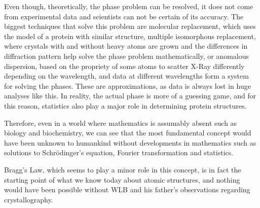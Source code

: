 \documentclass[14pt]{article}
\begin{document}
Even though, theoretically, the phase problem can be resolved, it does not come from experimental data and scientists can not be certain of its accuracy. The biggest techniques that solve this problem are molecular replacement, which uses the model of a protein with similar structure, multiple isomorphous replacement, where crystals with and without heavy atoms are grown and the differences in diffraction pattern help solve the phase problem mathematically, or anomalous dispersion, based on the propriety of some atoms to scatter X-Ray differently depending on the wavelength, and data at different wavelengths form a system for solving the phases. These are approximations, as data is always lost in huge analyses like this. In reality, the actual phase is more of a guessing game, and for this reason, statistics also play a major role in determining protein structures.

Therefore, even in a world where mathematics is assumably absent such as biology and biochemistry, we can see that the most fundamental concept would have been unknown to humankind without developments in mathematics such as solutions to Schrödinger's equation, Fourier transformation and statistics.

Bragg's Law, which seems to play a minor role in this concept, is in fact the starting point of what we know today about atomic structures, and nothing would have been possible without WLB and his father's observations regarding crystallography.

\printglossary[title=Notes]
\printbibliography[title={REFERENCES }, heading=bibintoc]
\end{document}
